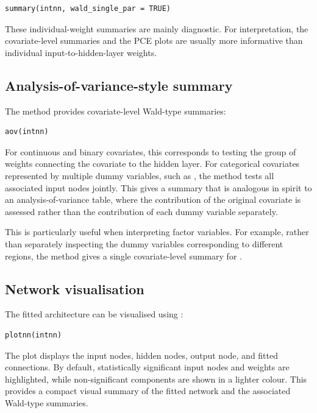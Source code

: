 \begin{verbatim}
summary(intnn, wald_single_par = TRUE)
\end{verbatim}

These individual-weight summaries are mainly diagnostic.
For interpretation, the covariate-level summaries and the PCE plots are usually more informative than individual input-to-hidden-layer weights.

\subsection{Analysis-of-variance-style summary}\label{analysis-of-variance-style-summary}

The  method provides covariate-level Wald-type summaries:

\begin{verbatim}
aov(intnn)
\end{verbatim}

For continuous and binary covariates, this corresponds to testing the group of weights connecting the covariate to the hidden layer.
For categorical covariates represented by multiple dummy variables, such as , the method tests all associated input nodes jointly.
This gives a summary that is analogous in spirit to an analysis-of-variance table, where the contribution of the original covariate is assessed rather than the contribution of each dummy variable separately.

This is particularly useful when interpreting factor variables.
For example, rather than separately inspecting the dummy variables corresponding to different regions, the  method gives a single covariate-level summary for .

\subsection{Network visualisation}\label{network-visualisation}

The fitted architecture can be visualised using :

\begin{verbatim}
plotnn(intnn)
\end{verbatim}

The plot displays the input nodes, hidden nodes, output node, and fitted connections.
By default, statistically significant input nodes and weights are highlighted, while non-significant components are shown in a lighter colour.
This provides a compact visual summary of the fitted network and the associated Wald-type summaries.

